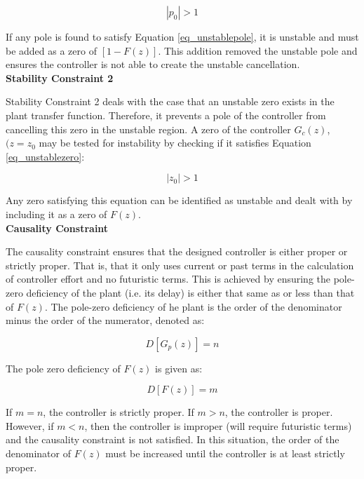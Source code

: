 \begin{equation}
\label{eq_unstablepole}
|p_0| > 1
\end{equation}

If any pole is found to satisfy Equation \ref{eq_unstablepole}, it is unstable and must be added as a zero of $[1 - F(z)]$. This addition removed the unstable pole and ensures the controller is not able to create the unstable cancellation.\\

\textbf{Stability Constraint 2}

Stability Constraint 2 deals with the case that an unstable zero exists in the plant transfer function. Therefore, it prevents a pole of the controller from cancelling this zero in the unstable region. A zero of the controller $G_c(z)$, $(z = z_0$ may be tested for instability by checking if it satisfies Equation \ref{eq_unstablezero}:

\begin{equation}
\label{eq_unstablezero}
|z_0| > 1
\end{equation}

Any zero satisfying this equation can be identified as unstable and dealt with by including it as a zero of $F(z)$.\\

\textbf{Causality Constraint}

The causality constraint ensures that the designed controller is either proper or strictly proper. That is, that it only uses current or past terms in the calculation of controller effort and no futuristic terms. This is achieved by ensuring the pole-zero deficiency of the plant (i.e. its delay) is either that same as or less than that of $F(z)$. The pole-zero deficiency of he plant is the order of the denominator minus the order of the numerator, denoted as:

\begin{equation}
\label{eq_plantdef}
D[ G_p(z) ] = n
\end{equation}

The pole zero deficiency of $F(z)$ is given as:

\begin{equation}
\label{eq_fdef}
D[ F(z) ] = m
\end{equation}

If $m = n$, the controller is strictly proper. If $m > n$, the controller is proper. However, if $m < n$, then the controller is improper (will require futuristic terms) and the causality constraint is not satisfied. In this situation, the order of the denominator of $F(z)$ must be increased until the controller is at least strictly proper.\\

